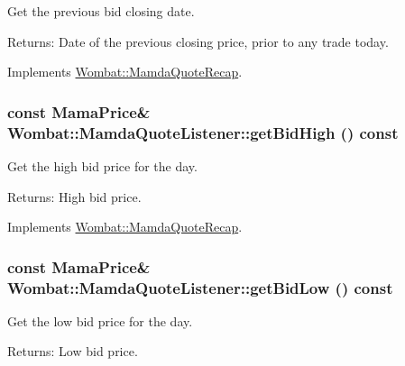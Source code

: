 Get the previous bid closing date. 

\begin{Desc}
\item[Returns:]Date of the previous closing price, prior to any trade today. \end{Desc}


Implements \hyperlink{classWombat_1_1MamdaQuoteRecap_2695af7f24f5782cf586e354eefe41fe}{Wombat::Mamda\-Quote\-Recap}.\hypertarget{classWombat_1_1MamdaQuoteListener_3f80653343c9fef6d788cf0ab4e33de7}{
\subsubsection[getBidHigh]{\setlength{\rightskip}{0pt plus 5cm}const Mama\-Price\& Wombat::Mamda\-Quote\-Listener::get\-Bid\-High () const}}
\label{classWombat_1_1MamdaQuoteListener_3f80653343c9fef6d788cf0ab4e33de7}


Get the high bid price for the day. 

\begin{Desc}
\item[Returns:]High bid price. \end{Desc}


Implements \hyperlink{classWombat_1_1MamdaQuoteRecap_c8ebabdee903b477922310050931ced6}{Wombat::Mamda\-Quote\-Recap}.\hypertarget{classWombat_1_1MamdaQuoteListener_8e61cef3c5d211789ec168c0d8866f18}{
\subsubsection[getBidLow]{\setlength{\rightskip}{0pt plus 5cm}const Mama\-Price\& Wombat::Mamda\-Quote\-Listener::get\-Bid\-Low () const}}
\label{classWombat_1_1MamdaQuoteListener_8e61cef3c5d211789ec168c0d8866f18}


Get the low bid price for the day. 

\begin{Desc}
\item[Returns:]Low bid price. \end{Desc}


